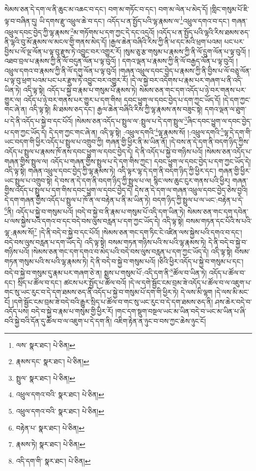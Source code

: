 སེམས་ཅན་དེ་དག་ལ་ནི་ཆུང་མ་འཆང་བ་དང་། བག་མ་གཏོང་བ་དང་། བག་མ་ལེན་པ་མེད་དོ། །གླིང་གསུམ་པོ་ཇི་ལྟ་བ་བཞིན་དུ། ཡི་དགས་རྫུ་འཕྲུལ་ཆེ་བ་དང་། འདོད་པ་ན་སྤྱོད་པའི་ལྷ་རྣམས་ལ་\footnote{ལས་  སྣར་ཐང་།  པེ་ཅིན། }འཕྲུལ་དགའ་བ་དང་། གཞན་འཕྲུལ་དབང་བྱེད་ཀྱི་ལྷ་རྣམས་\footnote{རྣམས་དང་  སྣར་ཐང་།  པེ་ཅིན། }མ་གཏོགས་པ་དག་ཀྱང་དེ་དང་འདྲའོ། །འདོད་པ་ན་སྤྱོད་པའི་ལྷའི་རིས་ཐམས་ཅད་ནི་ལྷའི་བུ་མོ་རྣམས་ལ་མངལ་གྱི་གནས་མེད་དོ། །རྒྱལ་ཆེན་བཞིའི་རིས་ཀྱི་ནི་ཕ་དང་མའི་ཕྲག་པའམ། པང་པར་བྱིས་པ་ལོ་ལྔ་ལོན་པ་ལྟ་བུ་རྫུས་ཏེ་འབྱུང་བར་འགྱུར་རོ། །སུམ་ཅུ་རྩ་གསུམ་པ་རྣམས་ཀྱི་ནི་ལོ་དྲུག་ལོན་པ་ལྟ་བུའོ། །འཐབ་བྲལ་པ་རྣམས་ཀྱི་ནི་ལོ་བདུན་ལོན་པ་ལྟ་བུའོ། །
དགའ་ལྡན་པ་རྣམས་ཀྱི་ནི་ལོ་བརྒྱད་ལོན་པ་ལྟ་བུའོ། །འཕྲུལ་དགའ་བ་རྣམས་ཀྱི་ནི་ལོ་དགུ་ལོན་པ་ལྟ་བུའོ། །གཞན་འཕྲུལ་དབང་བྱེད་པ་རྣམས་ཀྱི་ནི་བྱིས་པ་ལོ་བཅུ་ལོན་པ་ལྟ་བུ་ཕྲག་པའམ་པང་པར་རྫུས་ཏེ་འབྱུང་བར་འགྱུར་རོ། །དེ་ལ་སྐྱེ་བར་འདོགས་པ་རྣམ་པར་གཞག་པ་ནི་འདི་ཡིན་ཏེ། འདི་ལྟ་སྟེ། འདོད་པ་སྐྱེ་བ་རྣམ་པ་གསུམ་པོ་རྣམས་ཏེ། སེམས་ཅན་གང་དག་འདོད་པ་ཉེ་བར་གནས་པར་གྱུར་ལ། འདོད་པ་ཉེ་བར་གནས་པར་གྱུར་པ་དག་གིས། དབང་ཕྱུག་ལ་དབང་བྱེད་པ་དག་ཀྱང་ཡོད་དོ། །དེ་དག་ཀྱང་གང་ཞེ་ན། འདི་ལྟ་སྟེ། མི་ཐམས་ཅད་དང་། རྒྱལ་ཆེན་བཞིའི་རིས་ཀྱི་ལྷ་རྣམས་ནས་བཟུང་སྟེ། དགའ་ལྡན་ལ་ཐུག་པ་དེ་ནི་འདོད་པ་སྐྱེ་བ་དང་པོའོ། །སེམས་ཅན་འདོད་པ་སྤྲུལ་ལ་:སྤྲུལ་པ་དེ་དག་སྤྲུལ་\footnote{སྤྲུལ་  སྣར་ཐང་།  པེ་ཅིན། }ཞིང་དབང་ཕྱུག་ལ་དབང་བྱེད་པ་དག་ཀྱང་ཡོད་དེ། དེ་དག་ཀྱང་གང་ཞེ་ན། འདི་ལྟ་སྟེ། :འཕྲུལ་དགའི་\footnote{འཕྲུལ་དགའ་བའི་  སྣར་ཐང་།  པེ་ཅིན། }ལྷ་རྣམས་སོ། །:འཕྲུལ་དགའི་\footnote{འཕྲུལ་དགའ་བའི་  སྣར་ཐང་།  པེ་ཅིན། }ལྷ་དེ་དག་གི་ཡང་བདག་གི་ཕྱིར་འདོད་པ་སྤྲུལ་པ་འགྲུབ་ཀྱི། གཞན་གྱི་ཕྱིར་ནི་མ་ཡིན་ནོ། །དེ་བས་ན་དེ་དག་ནི་བདག་ཉིད་ཀྱིས་འདོད་པ་སྤྲུལ་པ་རྣམས་ཁོ་ནས་དབང་ཕྱུག་ལ་དབང་བྱེད་དེ། དེ་ནི་འདོད་པ་སྐྱེ་བ་གཉིས་པའོ། །སེམས་ཅན་འདོད་པ་གཞན་གྱིས་སྤྲུལ་ལ། འདོད་པ་གཞན་གྱིས་སྤྲུལ་པ་དེ་དག་གིས་ཀྱང་། དབང་ཕྱུག་ལ་དབང་བྱེད་པ་དག་ཀྱང་ཡོད་དེ། འདི་ལྟ་སྟེ། གཞན་འཕྲུལ་དབང་བྱེད་ཀྱི་ལྷ་རྣམས་ཏེ། འདི་ལྟར་ལྷ་དེ་དག་ནི་བདག་ཉིད་ཀྱི་ཕྱིར་དང་། གཞན་གྱི་ཕྱིར་ཡང་སྤྲུལ་པ་འགྲུབ་སྟེ། དེ་བས་ན་དེ་དག་ནི་བདག་ཉིད་ཀྱི་སྤྲུལ་པ་ལ། སྙིང་ལས་ཆུང་ངུར་གནས་པའི་ཕྱིར། གཞན་གྱིས་འདོད་པ་སྤྲུལ་པ་དག་གིས་དབང་ཕྱུག་ལ་དབང་བྱེད་དེ། དེས་ན་དེ་དག་ལ་གཞན་འཕྲུལ་དབང་བྱེད་ཅེས་བྱའི། དེ་དག་གཞན་གྱིས་འདོད་པ་སྤྲུལ་པ་ཁོ་ན་ལ་བརྟེན་པ་ནི་མ་ཡིན་ཏེ། བདག་ཉིད་ཀྱི་སྤྲུལ་པ་ལ་ཡང་:བརྟེན་པ་དེ་\footnote{བརྟེན་པ་  སྣར་ཐང་།  པེ་ཅིན། }ནི། འདོད་པ་སྐྱེ་བ་གསུམ་པའོ། །བདེ་བ་སྐྱེ་བ་ནི་རྣམ་པ་གསུམ་པོ་འདི་དག་ཡིན་ཏེ། སེམས་ཅན་གང་དག་དབེན་པ་ལས་སྐྱེས་པའི་དགའ་བ་དང་བདེ་བས་ལུས་བརླན་པ་དག་ཀྱང་ཡོད་དེ། འདི་ལྟ་སྟེ། བསམ་གཏན་དང་པོའི་ས་པའི་ལྷ་:རྣམས་སོ།\footnote{རྣམས་ཏེ།  སྣར་ཐང་།  པེ་ཅིན། } །དེ་ནི་བདེ་བ་སྐྱེ་བ་དང་པོའོ། །སེམས་ཅན་གང་དག་ཏིང་ངེ་འཛིན་ལས་སྐྱེས་པའི་དགའ་བ་དང་། བདེ་བས་ལུས་བརླན་པ་དག་ཡོད་དེ། འདི་ལྟ་སྟེ། བསམ་གཏན་གཉིས་པའི་ས་པའི་ལྷ་རྣམས་ཏེ། དེ་ནི་བདེ་བ་སྐྱེ་བ་གཉིས་པའོ། །སེམས་ཅན་གང་དག་དགའ་བ་མེད་པའི་བདེ་བས་ལུས་བརླན་པ་དག་ཀྱང་ཡོད་དེ། འདི་ལྟ་སྟེ། བསམ་གཏན་གསུམ་པའི་ས་པའི་ལྷ་རྣམས་ཏེ། དེ་ནི་བདེ་བ་སྐྱེ་བ་གསུམ་པའོ། །ཅིའི་ཕྱིར་འདོད་པ་སྐྱེ་བ་གསུམ་པ་དང་། བདེ་བ་སྐྱེ་བ་གསུམ་དུ་རྣམ་པར་གཞག་ཅེ་ན། སྨྲས་པ་གསུམ་པོ་:འདི་དག་ནི་\footnote{འདི་དག་གི་  སྣར་ཐང་།  པེ་ཅིན། }ཚོལ་བ་ཡིན་ཏེ། འདོད་པ་ཚོལ་བ་དང་། སྲིད་པ་ཚོལ་བ་དང་། ཚངས་པར་སྤྱོད་པ་ཚོལ་བའོ། །དེ་ལ་དགེ་སྦྱོང་ངམ་བྲམ་ཟེ་འདོད་པ་ཚོལ་བ་ལ་འཇུག་པ་གང་སུ་ཡང་རུང་བ་དེ་དག་ཐམས་ཅད་ནི་འདོད་པ་སྐྱེ་བ་གསུམ་པོ་དག་གི་ཕྱིར་ཏེ། དེ་ལས་མི་ལྷག །དེ་ལས་མི་མང་ངོ། །དགེ་སྦྱོང་ངམ་བྲམ་ཟེ་བདེ་བའི་རྒྱུར་སྲིད་པ་ཚོལ་བ་གང་སུ་ཡང་རུང་བ་དེ་དག་ཐམས་ཅད་ནི། ཤས་ཆེར་བདེ་བ་འདོད་པས། བདེ་བ་སྐྱེ་བ་རྣམ་པ་གསུམ་གྱི་ཕྱིར་རོ། །གང་དག་སྡུག་བསྔལ་ཡང་མ་ཡིན་བདེ་བ་ཡང་མ་ཡིན་པ་ཞི་བའི་སྐྱེ་བའི་དོན་དུ་ཚོལ་བ་ལ་འཇུག་པ་དེ་དག་ནི། འཇིག་རྟེན་ན་ཉུང་བ་བས་ཀྱང་ཆེས་ཉུང་ངོ། 